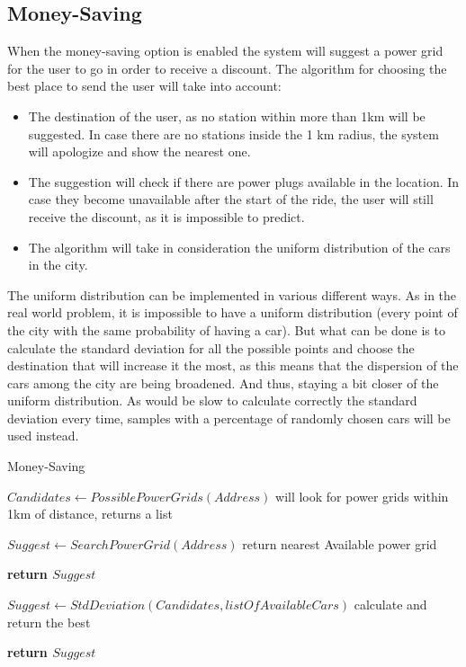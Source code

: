 \documentclass[a4paper]{article}
\begin{document}
\subsection{Money-Saving}
When the money-saving option is enabled the system will suggest a power grid for the user to go in order to receive a discount. The algorithm for choosing the best place to send the user will take into account:
\begin{itemize} 
\item  The destination of the user, as no station within more than 1km will be suggested. In case there are no stations inside the 1 km radius, the system will apologize and show the nearest one. 
\item The suggestion will check if there are power plugs available in the location. In case they become unavailable after the start of the ride, the user will still receive the discount, as it is impossible to predict.
\item The algorithm will take in consideration the uniform distribution of the cars in the city.
\end{itemize}
The uniform distribution can be implemented in various different ways. As in the real world problem, it is impossible to have a uniform distribution (every point of the city with the same probability of having a car). But what can be done is to calculate the standard deviation for all the possible points and choose the destination that will increase it the most, as this means that the dispersion of the cars among the city are being broadened. And thus, staying a bit closer of the uniform distribution. \newline
As would be slow to calculate correctly the standard deviation every time, samples with a percentage of randomly chosen cars will be used instead.

\begin{algorithm}[H]
\caption{Money-Saving}\label{Money}
\begin{algorithmic}[1]

\State $Candidates \leftarrow PossiblePowerGrids(Address)$ \Comment will look for power grids within 1km of distance, returns a list

	\State $Suggest \leftarrow SearchPowerGrid(Address)$ \Comment return nearest Available power grid
	
	\State \textbf{return $Suggest$}

\Else 
	\State $Suggest \leftarrow StdDeviation(Candidates, listOfAvailableCars)$ \Comment calculate and return the best
\EndIf

\State \textbf{return $Suggest$}
\EndProcedure
\end{algorithmic}
\end{algorithm}
\end{document}
